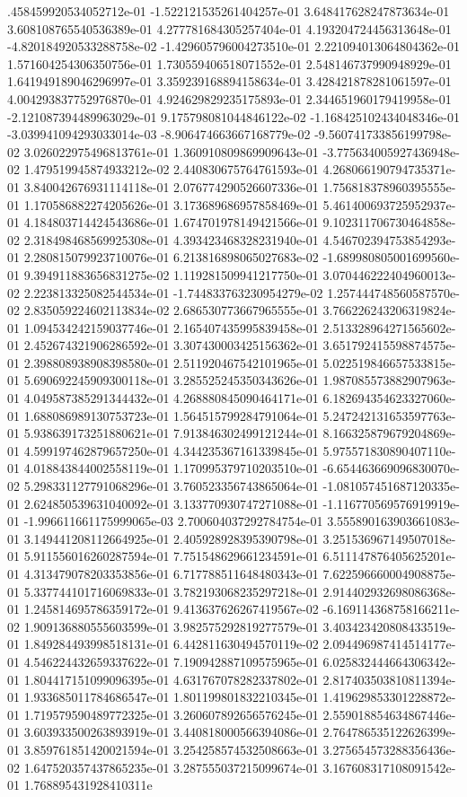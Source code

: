 .458459920534052712e-01	-1.522121535261404257e-01	3.648417628247873634e-01	3.608108765540536389e-01	4.277781684305257404e-01	4.193204724456313648e-01	-4.820184920533288758e-02	-1.429605796004273510e-01	2.221094013064804362e-01	1.571604254306350756e-01	1.730559406518071552e-01	2.548146737990948929e-01	1.641949189046296997e-01	3.359239168894158634e-01	3.428421878281061597e-01	4.004293837752976870e-01	4.924629829235175893e-01	2.344651960179419958e-01	-2.121087394489963029e-01	9.175798081044846122e-02	-1.168425102434048346e-01	-3.039941094293033014e-03	-8.906474663667168779e-02	-9.560741733856199798e-02	3.026022975496813761e-01	1.360910809869909643e-01	-3.775634005927436948e-02	1.479519945874933212e-02	2.440830675764761593e-01	4.268066190794735371e-01	3.840042676931114118e-01	2.076774290526607336e-01	1.756818378960395555e-01	1.170586882274205626e-01	3.173689686957858469e-01	5.461400693725952937e-01	4.184803714424543686e-01	1.674701978149421566e-01	9.102311706730464858e-02	2.318498468569925308e-01	4.393423468328231940e-01	4.546702394753854293e-01	2.280815079923710076e-01	6.213816898065027683e-02	-1.689980805001699560e-01	9.394911883656831275e-02	1.119281509941217750e-01	3.070446222404960013e-02	2.223813325082544534e-01	-1.744833763230954279e-02	1.257444748560587570e-02	2.835059224602113834e-02	2.686530773667965555e-01	3.766226243206319824e-01	1.094534242159037746e-01	2.165407435995839458e-01	2.513328964271565602e-01	2.452674321906286592e-01	3.307430003425156362e-01	3.651792415598874575e-01	2.398808938908398580e-01	2.511920467542101965e-01	5.022519846657533815e-01	5.690692245909300118e-01	3.285525245350343626e-01	1.987085573882907963e-01	4.049587385291344432e-01	4.268880845090464171e-01	6.182694354623327060e-01	1.688086989130753723e-01	1.564515799284791064e-01	5.247242131653597763e-01	5.938639173251880621e-01	7.913846302499121244e-01	8.166325879679204869e-01	4.599197462879657250e-01	4.344235367161339845e-01	5.975571830890407110e-01	4.018843844002558119e-01	1.170995379710203510e-01	-6.654463669096830070e-02	5.298331127791068296e-01	3.760523356743865064e-01	-1.081057451687120335e-01	2.624850539631040092e-01	3.133770930747271088e-01	-1.116770569576919919e-01	-1.996611661175999065e-03	2.700604037292784754e-01	3.555890163903661083e-01	3.149441208112664925e-01	2.405928928395390798e-01	3.251536967149507018e-01	5.911556016260287594e-01	7.751548629661234591e-01	6.511147876405625201e-01	4.313479078203353856e-01	6.717788511648480343e-01	7.622596660004908875e-01	5.337744101716069833e-01	3.782193068235297218e-01	2.914402932698086368e-01	1.245814695786359172e-01	9.413637626267419567e-02	-6.169114368758166211e-02	1.909136880555603599e-01	3.982575292819277579e-01	3.403423420808433519e-01	1.849284493998518131e-01	6.442811630494570119e-02	2.094496987414514177e-01	4.546224432659337622e-01	7.190942887109575965e-01	6.025832444664306342e-01	1.804417151099096395e-01	4.631767078282337802e-01	2.817403503810811394e-01	1.933685011784686547e-01	1.801199801832210345e-01	1.419629853301228872e-01	1.719579590489772325e-01	3.260607892656576245e-01	2.559018854634867446e-01	3.603933500263893919e-01	3.440818000566394086e-01	2.764786535122626399e-01	3.859761851420021594e-01	3.254258574532508663e-01	3.275654573288356436e-02	1.647520357437865235e-01	3.287555037215099674e-01	3.167608317108091542e-01	1.768895431928410311e